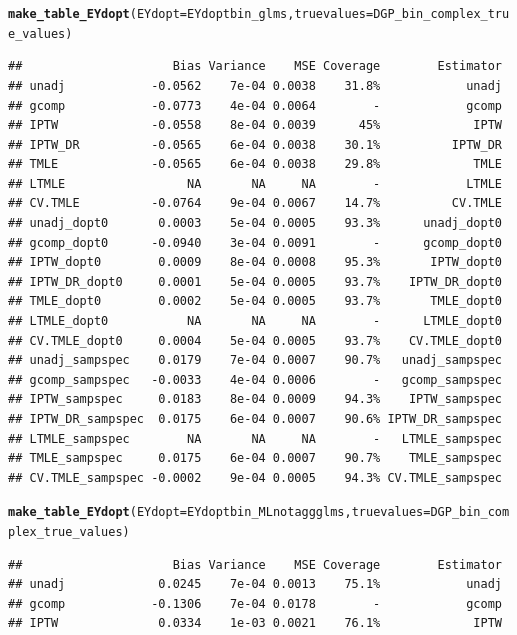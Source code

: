 \documentclass[11pt]{article}\usepackage[]{graphicx}\usepackage[]{color}
\makeatletter
\newcommand{\hlstd}[1]{\textcolor[rgb]{0.345,0.345,0.345}{#1}}%
\newcommand{\hlkwc}[1]{\textcolor[rgb]{0.333,0.667,0.333}{#1}}%
\newcommand{\hlkwd}[1]{\textcolor[rgb]{0.737,0.353,0.396}{\textbf{#1}}}%
\newenvironment{kframe}{%
 \def\at@end@of@kframe{}%
 \ifinner\ifhmode%
  \def\at@end@of@kframe{\end{minipage}}%
  \begin{minipage}{\columnwidth}%
 \fi\fi%
 \def\FrameCommand##1{\hskip\@totalleftmargin \hskip-\fboxsep
 \colorbox{shadecolor}{##1}\hskip-\fboxsep
     \hskip-\linewidth \hskip-\@totalleftmargin \hskip\columnwidth}%
 \MakeFramed {\advance\hsize-\width
   \@totalleftmargin\z@ \linewidth\hsize
   \@setminipage}}%
 {\par\unskip\endMakeFramed%
 \at@end@of@kframe}
\newenvironment{knitrout}{}{} %
\makeatother
\begin{document}
\begin{knitrout}
\color{fgcolor}\begin{kframe}
\begin{alltt}
\hlkwd{make_table_EYdopt}\hlstd{(}\hlkwc{EYdopt} \hlstd{= EYdoptbin_glms,} \hlkwc{truevalues} \hlstd{= DGP_bin_complex_true_values)}
\end{alltt}
\begin{verbatim}
##                     Bias Variance    MSE Coverage        Estimator
## unadj            -0.0562    7e-04 0.0038    31.8%            unadj
## gcomp            -0.0773    4e-04 0.0064        -            gcomp
## IPTW             -0.0558    8e-04 0.0039      45%             IPTW
## IPTW_DR          -0.0565    6e-04 0.0038    30.1%          IPTW_DR
## TMLE             -0.0565    6e-04 0.0038    29.8%             TMLE
## LTMLE                 NA       NA     NA        -            LTMLE
## CV.TMLE          -0.0764    9e-04 0.0067    14.7%          CV.TMLE
## unadj_dopt0       0.0003    5e-04 0.0005    93.3%      unadj_dopt0
## gcomp_dopt0      -0.0940    3e-04 0.0091        -      gcomp_dopt0
## IPTW_dopt0        0.0009    8e-04 0.0008    95.3%       IPTW_dopt0
## IPTW_DR_dopt0     0.0001    5e-04 0.0005    93.7%    IPTW_DR_dopt0
## TMLE_dopt0        0.0002    5e-04 0.0005    93.7%       TMLE_dopt0
## LTMLE_dopt0           NA       NA     NA        -      LTMLE_dopt0
## CV.TMLE_dopt0     0.0004    5e-04 0.0005    93.7%    CV.TMLE_dopt0
## unadj_sampspec    0.0179    7e-04 0.0007    90.7%   unadj_sampspec
## gcomp_sampspec   -0.0033    4e-04 0.0006        -   gcomp_sampspec
## IPTW_sampspec     0.0183    8e-04 0.0009    94.3%    IPTW_sampspec
## IPTW_DR_sampspec  0.0175    6e-04 0.0007    90.6% IPTW_DR_sampspec
## LTMLE_sampspec        NA       NA     NA        -   LTMLE_sampspec
## TMLE_sampspec     0.0175    6e-04 0.0007    90.7%    TMLE_sampspec
## CV.TMLE_sampspec -0.0002    9e-04 0.0005    94.3% CV.TMLE_sampspec
\end{verbatim}
\begin{alltt}
\hlkwd{make_table_EYdopt}\hlstd{(}\hlkwc{EYdopt} \hlstd{= EYdoptbin_MLnotaggglms,} \hlkwc{truevalues} \hlstd{= DGP_bin_complex_true_values)}
\end{alltt}
\begin{verbatim}
##                     Bias Variance    MSE Coverage        Estimator
## unadj             0.0245    7e-04 0.0013    75.1%            unadj
## gcomp            -0.1306    7e-04 0.0178        -            gcomp
## IPTW              0.0334    1e-03 0.0021    76.1%             IPTW

\end{verbatim}
\end{kframe}
\end{knitrout}
\end{document}

